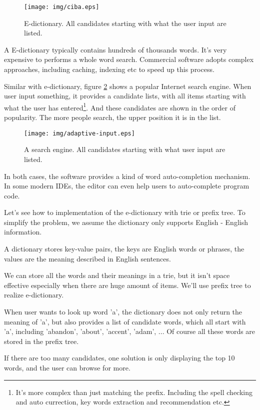 \documentclass{article}
\begin{document}
\begin{figure}[htbp]
  \centering
  \texttt{[image: img/ciba.eps]}
  \caption{E-dictionary. All candidates starting with what the user input are listed.}
  \label{fig:e-dict}
\end{figure}

A E-dictionary typically contains hundreds of thousands words. It's very expensive
to performs a whole word search. Commercial software adopts complex approaches, including
caching, indexing etc to speed up this process.

Similar with e-dictionary, figure \ref{fig:word-completion} shows a popular
Internet search engine. When user input something, it provides a candidate
lists, with all items starting with what the user has entered\footnote{It's more complex than just matching the prefix. Including the spell checking and auto currection, key words extraction and recommendation etc.}. And these candidates
are shown in the order of popularity. The more people search, the
upper position it is in the list.

\begin{figure}[htbp]
  \centering
  \texttt{[image: img/adaptive-input.eps]}
  \caption{A search engine. All candidates starting with what user input are listed.}
  \label{fig:word-completion}
\end{figure}

In both cases, the software provides a kind of word auto-completion mechanism.
In some modern IDEs, the editor can even help users to auto-complete program code.

Let's see how to implementation of the e-dictionary with trie or prefix tree.
To simplify the problem, we assume the dictionary only supports English - English
information.

A dictionary stores key-value pairs, the keys are English
words or phrases, the values are the meaning described in English sentences.

We can store all the words and their meanings in a trie, but it isn't
space effective especially when there are huge amount of items. We'll use
prefix tree to realize e-dictionary.

When user wants to look up word 'a', the dictionary does not only
return the meaning of 'a', but also provides a list of
candidate words, which all start with 'a', including 'abandon', 'about',
'accent', 'adam', ... Of course all these words are stored in the prefix tree.

If there are too many candidates, one solution is only displaying the top 10
words, and the user can browse for more.
\end{document}
